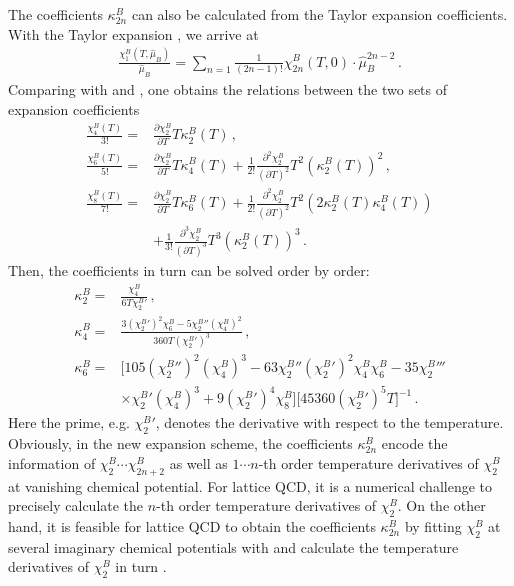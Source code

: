 \documentclass[%
reprint,
superscriptaddress,
preprintnumbers,
amsmath,amssymb,
aps,
prd,
]{revtex4-2}
\def\Eq#1{\Cref{#1}}
\begin{document}
The coefficients $\kappa^B_{2n}$ can also be calculated from the Taylor expansion coefficients.
With the Taylor expansion , we arrive at
\begin{align}
\frac{\chi_1^B(T,\hat \mu_B)}{\hat \mu_B}=\sum_{n=1}\frac{1}{(2n-1)!}\chi^B_{2n}(T,0) \cdot \hat \mu_B^{2n-2}\,.
\label{eq:Talyorchi1}
\end{align}
Comparing  with  and , one obtains the relations between the two sets of expansion coefficients
\begin{align}
\frac{\chi_4^B(T)}{3!}=&\frac{\partial \chi_2^B}{ \partial T} T \kappa_2^B(T)\,,\\[2ex]
\frac{\chi_6^B(T)}{5!}=&\frac{\partial \chi_2^B}{ \partial T} T \kappa_4^B(T) +\frac{1}{2!}\frac{\partial^2 \chi_2^B}{(\partial T)^2} T^2 (\kappa_2^B(T))^2\,,\\[2ex]
\frac{\chi_8^B(T)}{7!}=&\frac{\partial \chi_2^B}{ \partial T} T \kappa_6^B(T)
+\frac{1}{2!}\frac{\partial^2 \chi_2^B}{(\partial T)^2} T^2 (2 \kappa_2^B(T)\kappa_4^B(T)) \nonumber \\[1ex]
&+\frac{1}{3!}\frac{\partial^3 \chi_2^B}{(\partial T)^3} T^3 (\kappa_2^B(T))^3\,.
\end{align}
Then, the coefficients in turn can be solved order by order:
\begin{align}
\kappa^B_2 =& \frac{\chi^B_4}{6 T {\chi^B_2}'}\,,\label{eq:Talyorcalkappa2}\\[2ex]
\kappa^B_4 =&\frac{3 ({\chi^B_2}')^2 \chi^B_6-5 {\chi^B_2}'' (\chi^B_4)^2}{360 T ({\chi^B_2}')^3}\,,\label{eq:Talyorcalkappa4}\\[2ex]
\kappa^B_6 =&\Big[105 ({\chi^B_2}'')^2 (\chi^B_4)^3-63 {\chi^B_2}''({\chi^B_2}')^2 \chi^B_4  \chi^B_6 -35 {\chi^B_2}''' \nonumber \\[1ex]
&\times{\chi^B_2}' (\chi^B_4)^3+9 ({\chi^B_2}')^4 \chi^B_8\Big] \Big[45360 ({\chi^B_2}')^5 T\Big]^{-1}\,.
\label{eq:Talyorcalkappa6}
\end{align}
Here the prime, e.g. ${\chi^B_2}'$, denotes the derivative with respect to the temperature. Obviously, in the new expansion scheme, the coefficients $\kappa^B_{2n}$ encode the information of $\chi^B_{2} \cdots \chi^B_{2n+2}$ as well as $1\cdots n$-th order temperature derivatives of ${\chi^B_2}$ at vanishing chemical potential. For lattice QCD, it is a numerical challenge to precisely calculate the  $n$-th order temperature derivatives of ${\chi^B_2}$. On the other hand, it is feasible for lattice QCD to obtain the coefficients $\kappa^B_{2n}$ by fitting ${\chi^B_2}$ at several imaginary chemical potentials with \Eq{eq:T_res} and calculate the temperature derivatives of ${\chi^B_2}$ in turn \cite{Borsanyi:2021sxv}. 
\end{document}
